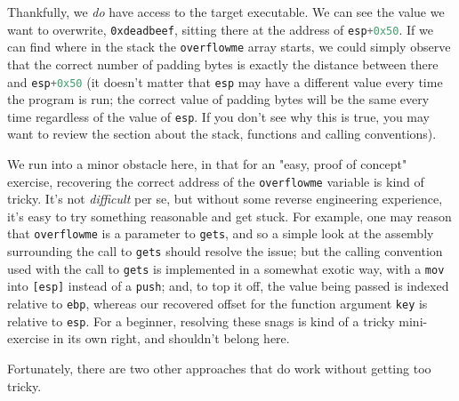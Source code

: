 \documentclass{article}
\newcommand{\xcode}[2]{\colorbox{ubuntuback}{\lstinline[language=#1]|#2|}}
\newcommand{\asm}[1]{\xcode{{[x86masm]assembler}}{#1}}
\newcommand{\code}[1]{\colorbox{ubuntuback}{\texttt{#1}}}
\newcommand{\gdb}[1]{\xcode{C}{#1}}
\begin{document}
Thankfully, we \textit{do} have access to the target executable. We can see the value we want to overwrite, \code{0xdeadbeef}, sitting there at the address of \gdb{esp+0x50}. If we can find where in the stack the \xcode{C}{overflowme} array starts, we could simply observe that the correct number of padding bytes is exactly the distance between there and \gdb{esp+0x50} (it doesn't matter that \asm{esp} may have a different value every time the program is run; the correct value of padding bytes will be the same every time regardless of the value of \asm{esp}. If you don't see why this is true, you may want to review the section about the stack, functions and calling conventions).

We run into a minor obstacle here, in that for an "easy, proof of concept" exercise, recovering the correct address of the \xcode{C}{overflowme} variable is kind of tricky. It's not \textit{difficult} per se, but without some reverse engineering experience, it's easy to try something reasonable and get stuck. For example, one may reason that \xcode{C}{overflowme} is a parameter to \xcode{C}{gets}, and so a simple look at the assembly surrounding the call to \xcode{C}{gets} should resolve the issue; but the calling convention used with the call to \xcode{C}{gets} is implemented in a somewhat exotic way, with a \asm{mov} into \asm{[esp]} instead of a \asm{push}; and, to top it off, the value being passed is indexed relative to \asm{ebp}, whereas our recovered offset for the function argument \xcode{C}{key} is relative to \asm{esp}. For a beginner, resolving these snags is kind of a tricky mini-exercise in its own right, and shouldn't belong here.

Fortunately, there are two other approaches that do work without getting too tricky. 
\end{document}
